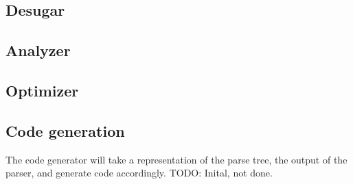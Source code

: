 \subsection{Desugar}

\subsection{Analyzer}

\subsection{Optimizer}

\subsection{Code generation}
The code generator will take a representation of the
parse tree, the output of the parser, and generate code
accordingly. TODO: Inital, not done.
